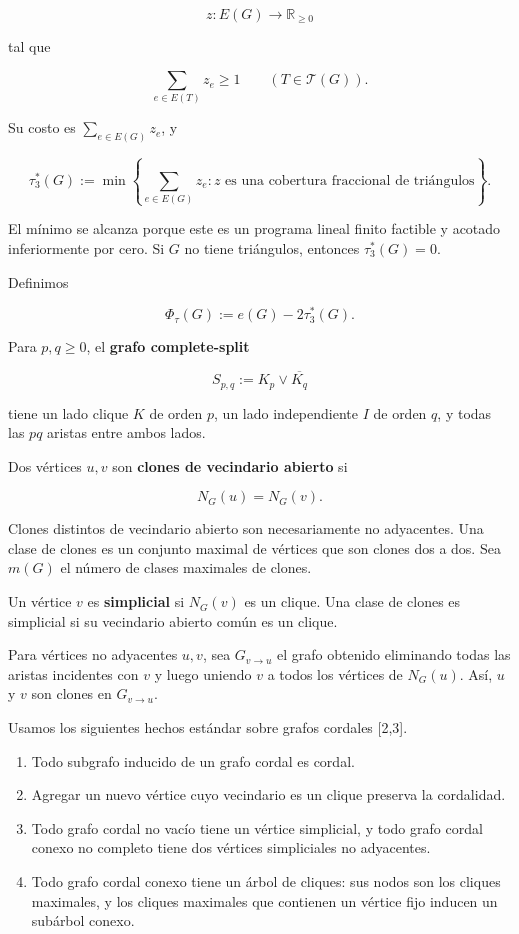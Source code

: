 \documentclass[
  11pt,
]{article}
\providecommand{\tightlist}{%
  \setlength{\itemsep}{0pt}\setlength{\parskip}{0pt}}
\begin{document}
\[
z:E(G)\longrightarrow\mathbb R_{\ge0}
\]

tal que

\[
\sum_{e\in E(T)}z_e\ge1
\qquad (T\in\mathcal T(G)).
\]

Su costo es \(\sum_{e\in E(G)}z_e\), y

\[
\tau_3^*(G)
:=
\min\left\{
\sum_{e\in E(G)}z_e:
z\text{ es una cobertura fraccional de triángulos}
\right\}.
\]

El mínimo se alcanza porque este es un programa lineal finito factible y
acotado inferiormente por cero. Si \(G\) no tiene triángulos, entonces
\(\tau_3^*(G)=0\).

Definimos

\[
\Phi_\tau(G):=e(G)-2\tau_3^*(G).
\]

Para \(p,q\ge0\), el \textbf{grafo complete-split}

\[
S_{p,q}:=K_p\vee\overline{K_q}
\]

tiene un lado clique \(K\) de orden \(p\), un lado independiente \(I\)
de orden \(q\), y todas las \(pq\) aristas entre ambos lados.

Dos vértices \(u,v\) son \textbf{clones de vecindario abierto} si

\[
N_G(u)=N_G(v).
\]

Clones distintos de vecindario abierto son necesariamente no adyacentes.
Una clase de clones es un conjunto maximal de vértices que son clones
dos a dos. Sea \(m(G)\) el número de clases maximales de clones.

Un vértice \(v\) es \textbf{simplicial} si \(N_G(v)\) es un clique. Una
clase de clones es simplicial si su vecindario abierto común es un
clique.

Para vértices no adyacentes \(u,v\), sea \(G_{v\to u}\) el grafo
obtenido eliminando todas las aristas incidentes con \(v\) y luego
uniendo \(v\) a todos los vértices de \(N_G(u)\). Así, \(u\) y \(v\) son
clones en \(G_{v\to u}\).

Usamos los siguientes hechos estándar sobre grafos cordales {[}2,3{]}.

\begin{enumerate}
\def\labelenumi{\arabic{enumi}.}
\tightlist
\item
  Todo subgrafo inducido de un grafo cordal es cordal.
\item
  Agregar un nuevo vértice cuyo vecindario es un clique preserva la
  cordalidad.
\item
  Todo grafo cordal no vacío tiene un vértice simplicial, y todo grafo
  cordal conexo no completo tiene dos vértices simpliciales no
  adyacentes.
\item
  Todo grafo cordal conexo tiene un árbol de cliques: sus nodos son los
  cliques maximales, y los cliques maximales que contienen un vértice
  fijo inducen un subárbol conexo.
\end{enumerate}
\end{document}

